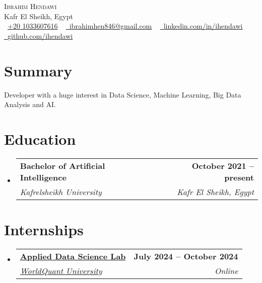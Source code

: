 \documentclass[letterpaper,11pt]{article}
\makeatletter
\newcommand{\resumeSubheading}[4]{
  \vspace{-2pt}\item
    \begin{tabular*}{1.0\textwidth}[t]{l@{\extracolsep{\fill}}r}
      \textbf{#1} & \textbf{\small #2} \\
      \textit{\small#3} & \textit{\small #4} \\
    \end{tabular*}\vspace{-7pt}
}
\newcommand{\resumeSubHeadingListStart}{\begin{itemize}[leftmargin=0.0in, label={}]}
\newcommand{\resumeSubHeadingListEnd}{\end{itemize}}
\makeatother
\begin{document}
\begin{center}


  {\Huge \scshape Ibrahim Hendawi} \\ \vspace{1pt}
  Kafr El Sheikh, Egypt \\ \vspace{1pt}
  \small
  {\raisebox{-0.1\height}
  \faPhone\ 
  \underline{+20 1033607616}} ~ 
  \href{mailto:ibrahimhen846@gmail.com}
  {\raisebox{-0.2\height}
  \faEnvelope\
  \underline{ibrahimhen846@gmail.com}} ~
  \href{https://www.linkedin.com/in/ihendawi/}
  {\raisebox{-0.2\height}
  \faLinkedin\ 
  \underline{linkedin.com/in/ihendawi}}  ~
  \href{https://github.com/ihendawi}
  {\raisebox{-0.2\height}
  \faGithub\ 
  \underline{github.com/ihendawi}}
  \vspace{-8pt}


\end{center}


\section{Summary}
Developer with a huge interest in Data Science, Machine Learning, Big Data Analysis and AI.


\section{Education}
  \resumeSubHeadingListStart
    \resumeSubheading
      {Bachelor of Artificial Intelligence}{October 2021 -- present}
      {Kafrelsheikh University}{Kafr El Sheikh, Egypt}
  \resumeSubHeadingListEnd

  
  \vspace{-13pt}


\section{Internships}
  \resumeSubHeadingListStart
    \resumeSubheading
      {\href{https://www.credly.com/badges/53dc8e8f-64e7-4081-8d7c-0b149df635aa}{Applied Data Science Lab}}{July 2024 -- October 2024}
      {\href{https://www.credly.com/organizations/wqu/badges}{WorldQuant University}}{Online}
  \resumeSubHeadingListEnd
  \vspace{-10pt}
  
\end{document}
